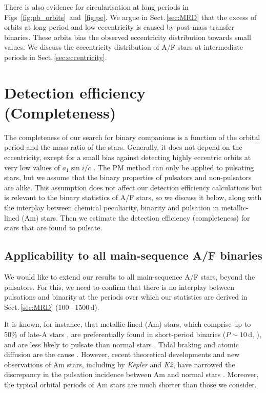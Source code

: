 \documentclass[a4paper,fleqn,usenatbib]{mnras}
\begin{document}
There is also evidence for circularisation at long periods in Figs~\ref{fig:pb_orbits}~and~\ref{fig:pe}. We argue in Sect.\,\ref{sec:MRD} that the excess of orbits at long period and low eccentricity is caused by post-mass-transfer binaries. These orbits bias the observed eccentricity distribution towards small values. We discuss the eccentricity distribution of A/F stars at intermediate periods in Sect.\,\ref{sec:eccentricity}.





\section{Detection efficiency (Completeness)}
\label{sec:completeness}

The completeness of our search for binary companions is a function of the orbital period and the mass ratio of the stars. Generally, it does not depend on the eccentricity, except for a small bias against detecting highly eccentric orbits at very low values of $a_1 \sin i/c$ \citep{murphyetal2016b}. The PM method can only be applied to pulsating stars, but we assume that the binary properties of pulsators and non-pulsators are alike. This assumption does not affect our detection efficiency calculations but is relevant to the binary statistics of A/F stars, so we discuss it below, along with the interplay between chemical peculiarity, binarity and pulsation in metallic-lined (Am) stars. Then we estimate the detection efficiency (completeness) for stars that are found to pulsate.


\subsection{Applicability to all main-sequence A/F binaries}
\label{ssec:proxies}

We would like to extend our results to all main-sequence A/F stars, beyond the pulsators. For this, we need to confirm that there is no interplay between pulsations and binarity at the periods over which our statistics are derived in Sect.\,\ref{sec:MRD} (100\,--\,1500\,d).

It is known, for instance, that metallic-lined (Am) stars, which comprise up to 50\% of late-A stars \citep{wolff1983}, are preferentially found in short-period binaries ($P\sim10$\,d, \citealt{abt1961,vauclair1976,debernardi2000}), and are less likely to pulsate than normal stars \citep{breger1970,kurtzetal1976}. Tidal braking and atomic diffusion are the cause \citep{baglinetal1973}. However, recent theoretical developments and new observations of Am stars, including by \textit{Kepler} and \textit{K2}, have narrowed the discrepancy in the pulsation incidence between Am and normal stars \citep{smalleyetal2011,antocietal2014,smalleyetal2017}. Moreover, the typical orbital periods of Am stars are much shorter than those we consider.
\end{document}
